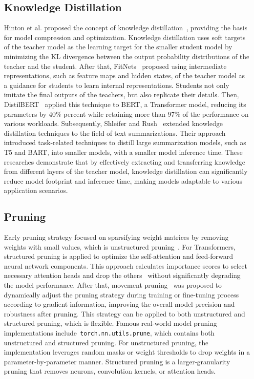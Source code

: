 \subsection{Knowledge Distillation}\label{subsec:rw:knowledge-distillation}
Hinton et al. proposed the concept of knowledge distillation~\cite{hinton2015distilling},
providing the basis for model compression and optimization.
Knowledge distillation uses soft targets of the teacher model as the learning target for the smaller student model
by minimizing the KL divergence between the output probability distributions of the teacher and the student.
After that, FitNets~\cite{romero2014fitnets} proposed using intermediate representations,
such as feature maps and hidden states, of the teacher model as a guidance for students to learn internal representations.
Students not only imitate the final outputs of the teachers, but also replicate their details.
Then, DistilBERT~\cite{sanh2019distilbert} applied this technique to BERT, a Transformer model,
reducing its parameters by 40\% percent while retaining more than 97\% of the performance on various workloads.
Subsequently, Shleifer and Rush~\cite{shleifer2020pre} extended knowledge distillation techniques to the field of text summarizations.
Their approach introduced task-related techniques to distill large summarization models,
such as T5 and BART, into smaller models, with a smaller model inference time.
These researches demonstrate that by effectively extracting and transferring knowledge from different layers of the teacher model,
knowledge distillation can significantly reduce model footprint and inference time,
making models adaptable to various application scenarios.

\subsection{Pruning}\label{subsec:rw:pruning}
Early pruning strategy focused on sparsifying weight matrices by removing weights with small values,
which is unstructured pruning~\cite{han2015learning}.
For Transformers, structured pruning is applied to optimize the self-attention and feed-forward neural network components.
This approach calculates importance scores to select necessary attention heads and drop the others~\cite{michel2019sixteen}
without significantly degrading the model performance.
After that, movement pruning~\cite{sanh2020movement} was proposed to dynamically adjust the pruning strategy during training
or fine-tuning process according to gradient information, improving the overall model precision and robustness after pruning.
This strategy can be applied to both unstructured and structured pruning, which is flexible.
Famous real-world model pruning implementations include~\texttt{torch.nn.utils.prune},
which contains both unstructured and structured pruning.
For unstructured pruning, the implementation leverages random masks or weight thresholds to drop weights in a parameter-by-parameter manner.
Structured pruning is a larger-granularity pruning that removes neurons, convolution kernels, or attention heads.

